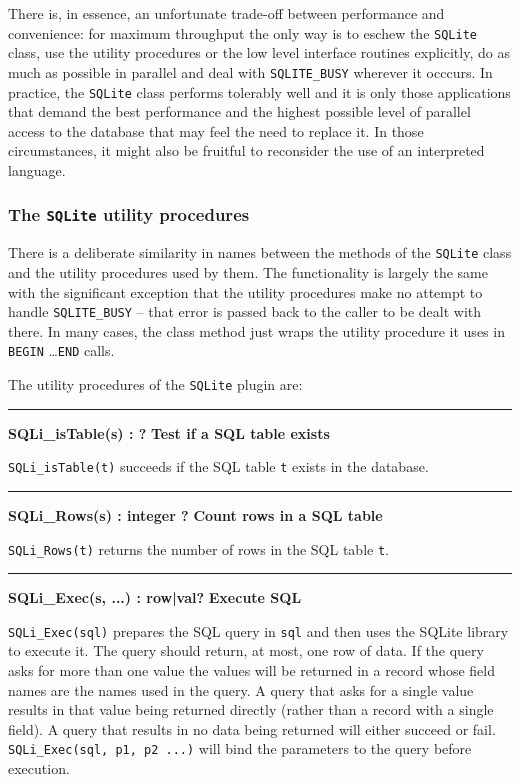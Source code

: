 There is, in essence, an unfortunate trade-off between performance and
convenience: for maximum throughput the only way is to eschew the
\texttt{SQLite} class, use the utility procedures or the low level interface
routines explicitly, do as much as possible in parallel and deal with
\texttt{SQLITE\_BUSY} wherever it occcurs.  In practice, the \texttt{SQLite}
class performs tolerably well and it is only those applications that demand the
best performance and the highest possible level of parallel access to the
database that may feel the need to replace it. In those circumstances, it
might also be fruitful to reconsider the use of an interpreted language.

\subsubsection{The \texttt{SQLite} utility procedures}
There is a deliberate similarity in names between the methods of the
\texttt{SQLite} class and the utility procedures used by them. The functionality
is largely the same with the significant exception that the utility procedures
make no attempt to handle \texttt{SQLITE\_BUSY} -- that error is passed back
to the caller to be dealt with there. In many cases, the class method just
wraps the utility procedure it uses in \texttt{BEGIN} \ldots \texttt{END} calls.

The utility procedures of the \texttt{SQLite} plugin are:
\bigskip\hrule\vspace{0.1cm}
\noindent
{\bf SQLi\_isTable(s) :  ? } \hfill {\bf Test if a SQL table exists}

\noindent
\texttt{SQLi\_isTable(t)} succeeds if the SQL table \texttt{t} exists in the database.

\bigskip\hrule\vspace{0.1cm}
\noindent
{\bf SQLi\_Rows(s) : integer ? } \hfill {\bf Count rows in a SQL table}

\noindent
\texttt{SQLi\_Rows(t)} returns the number of rows in the SQL table \texttt{t}.

\bigskip\hrule\vspace{0.1cm}
\noindent
{\bf SQLi\_Exec(s, ...) : row|val? } \hfill {\bf Execute SQL}

\noindent
\texttt{SQLi\_Exec(sql)} prepares the SQL query in \texttt{sql} and then uses
the SQLite library to execute it. The query should return, at most, one row of
data.  If the query asks for more than one value the values will be returned in
a record whose field names are the names used in the query. A query that asks for a
single value results in that value being returned directly (rather than a record
with a single field). A query that results in no data being returned will either
succeed or fail.  \texttt{SQLi\_Exec(sql, p1, p2 ...)}  will bind the parameters
to the query before execution.

